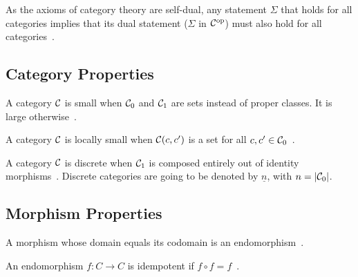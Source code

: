 \begin{remark}
  As the axioms of category theory are self-dual, any statement $\Sigma$ that
  holds for all categories implies that its dual statement ($\Sigma$ in
  $\mathcal{C}^{\mathrm{op}}$) must also hold for all
  categories~\parencite[p.~16]{leinster:basic_category_theory}.
\end{remark}

\subsection{Category Properties}

\begin{definition}
  A category $\mathcal{C}$ is small when $\mathcal{C}_0$ and $\mathcal{C}_1$ are sets instead of proper
  classes. It is large otherwise~\parencite[p.~24]{awodey:category_theory}.
\end{definition}

\begin{definition}
  A category $\mathcal{C}$ is locally small when $\mathcal{C}(c, c')$ is a set for all $c,c'\in
  \mathcal{C}_0$~\parencite[p.~25]{awodey:category_theory}.
\end{definition}

\begin{definition}
  A category $\mathcal{C}$ is discrete when $\mathcal{C}_1$ is composed entirely out of identity
  morphisms~\parencite[p.~11]{awodey:category_theory}. Discrete categories are
  going to be denoted by $\underline{n}$, with $n=|\mathcal{C}_0|$.
\end{definition}

\subsection{Morphism Properties}

\begin{definition}
  A morphism whose domain equals its codomain is an
  endomorphism~\parencite[p.~7]{riehl:category_theory_in_context}.
\end{definition}

\begin{definition}
  An endomorphism $f:C\to C$ is idempotent if $f\circ f =
  f$~\parencite[p.~20]{lane:working_mathematician}.
\end{definition}

